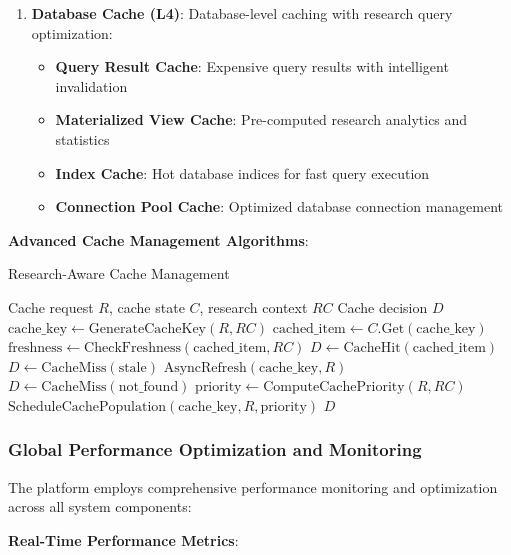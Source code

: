 \documentclass[10pt,twocolumn]{article}
\begin{document}
\begin{enumerate}
    \item \textbf{Database Cache (L4)}: Database-level caching with research query optimization:
    \begin{itemize}
        \item \textbf{Query Result Cache}: Expensive query results with intelligent invalidation
        \item \textbf{Materialized View Cache}: Pre-computed research analytics and statistics
        \item \textbf{Index Cache}: Hot database indices for fast query execution
        \item \textbf{Connection Pool Cache}: Optimized database connection management
    \end{itemize}
\end{enumerate}

\textbf{Advanced Cache Management Algorithms}:

\begin{algorithm}[H]
\caption{Research-Aware Cache Management}
\label{alg:cache_management}
\begin{algorithmic}[1]
\REQUIRE Cache request $R$, cache state $C$, research context $RC$
\ENSURE Cache decision $D$
\STATE $\text{cache\_key} \leftarrow \text{GenerateCacheKey}(R, RC)$
\STATE $\text{cached\_item} \leftarrow C.\text{Get}(\text{cache\_key})$
    \STATE $\text{freshness} \leftarrow \text{CheckFreshness}(\text{cached\_item}, RC)$
        \STATE $D \leftarrow \text{CacheHit}(\text{cached\_item})$
    \ELSE
        \STATE $D \leftarrow \text{CacheMiss}(\text{stale})$
        \STATE $\text{AsyncRefresh}(\text{cache\_key}, R)$
    \ENDIF
\ELSE
    \STATE $D \leftarrow \text{CacheMiss}(\text{not\_found})$
    \STATE $\text{priority} \leftarrow \text{ComputeCachePriority}(R, RC)$
    \STATE $\text{ScheduleCachePopulation}(\text{cache\_key}, R, \text{priority})$
\ENDIF
\RETURN $D$
\end{algorithmic}
\end{algorithm}

\subsubsection{Global Performance Optimization and Monitoring}

The platform employs comprehensive performance monitoring and optimization across all system components:

\textbf{Real-Time Performance Metrics}:
\end{document}
